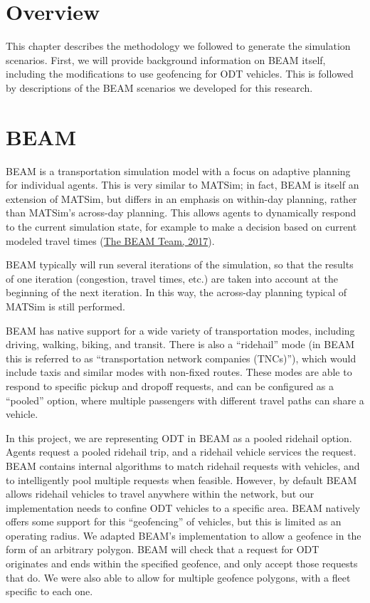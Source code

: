 \documentclass[
]{report}
\begin{document}
\hypertarget{overview-1}{%
\section{Overview}\label{overview-1}}

This chapter describes the methodology we followed to generate the simulation scenarios. First, we will provide background information on BEAM itself, including the modifications to use geofencing for ODT vehicles. This is followed by descriptions of the BEAM scenarios we developed for this research.

\hypertarget{beam}{%
\section{BEAM}\label{beam}}

BEAM is a transportation simulation model with a focus on adaptive planning for individual agents. This is very similar to MATSim; in fact, BEAM is itself an extension of MATSim, but differs in an emphasis on within-day planning, rather than MATSim's across-day planning. This allows agents to dynamically respond to the current simulation state, for example to make a decision based on current modeled travel times (\protect\hyperlink{ref-beamdocs}{The BEAM Team, 2017}).

BEAM typically will run several iterations of the simulation, so that the results of one iteration (congestion, travel times, etc.) are taken into account at the beginning of the next iteration. In this way, the across-day planning typical of MATSim is still performed.

BEAM has native support for a wide variety of transportation modes, including driving, walking, biking, and transit. There is also a ``ridehail'' mode (in BEAM this is referred to as ``transportation network companies (TNCs)''), which would include taxis and similar modes with non-fixed routes. These modes are able to respond to specific pickup and dropoff requests, and can be configured as a ``pooled'' option, where multiple passengers with different travel paths can share a vehicle.

In this project, we are representing ODT in BEAM as a pooled ridehail option. Agents request a pooled ridehail trip, and a ridehail vehicle services the request. BEAM contains internal algorithms to match ridehail requests with vehicles, and to intelligently pool multiple requests when feasible. However, by default BEAM allows ridehail vehicles to travel anywhere within the network, but our implementation needs to confine ODT vehicles to a specific area. BEAM natively offers some support for this ``geofencing'' of vehicles, but this is limited as an operating radius. We adapted BEAM's implementation to allow a geofence in the form of an arbitrary polygon. BEAM will check that a request for ODT originates and ends within the specified geofence, and only accept those requests that do. We were also able to allow for multiple geofence polygons, with a fleet specific to each one.
\end{document}
